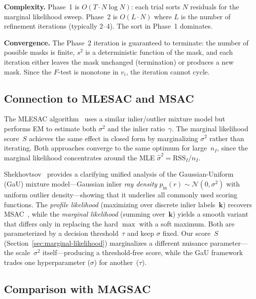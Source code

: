 \documentclass[11pt]{article}
\newcommand{\Normal}{\mathcal{N}}
\begin{document}
\noindent \textbf{Complexity.}
Phase~1 is $O(T \cdot N \log N)$: each trial sorts $N$ residuals for
the marginal likelihood sweep.  Phase~2 is $O(L \cdot N)$ where $L$
is the number of refinement iterations (typically 2--4).  The sort in
Phase~1 dominates.

\noindent \textbf{Convergence.}
The Phase~2 iteration is guaranteed to terminate: the number of
possible masks is finite, $s^2$ is a deterministic function of the
mask, and each iteration either leaves the mask unchanged (termination)
or produces a new mask.  Since the $F$-test is monotone in $v_i$, the
iteration cannot cycle.

\subsection{Connection to MLESAC and MSAC}
\label{sec:mlesac-connection}

The MLESAC algorithm~\cite{torr2000mlesac} uses a similar inlier/outlier
mixture model but performs EM to estimate both $\sigma^2$ and the inlier
ratio~$\gamma$.  The marginal likelihood score~$S$ achieves the same effect
in closed form by marginalizing $\sigma^2$ rather than iterating.  Both
approaches converge to the same optimum for large~$n_I$, since the
marginal likelihood concentrates around the MLE
$\hat\sigma^2 = \mathrm{RSS}_I / n_I$.

Shekhovtsov~\cite{shekhovtsov2025scoring} provides a clarifying unified
analysis of the Gaussian-Uniform (GaU) mixture model---Gaussian inlier
\emph{ray density} $p_{\mathrm{in}}(r) \sim \Normal(0, \sigma^2)$ with
uniform outlier density---showing that it underlies all commonly used
scoring functions.  The \emph{profile likelihood} (maximizing over
discrete inlier labels~$\mathbf{k}$) recovers
MSAC~\cite{torr1998robust}, while the \emph{marginal likelihood}
(summing over~$\mathbf{k}$) yields a smooth variant that differs only
in replacing the hard $\max$ with a soft maximum.  Both are
parameterized by a decision threshold~$\tau$ and keep $\sigma$ fixed.
Our score~$S$ (Section~\ref{sec:marginal-likelihood}) marginalizes a
different nuisance parameter---the scale~$\sigma^2$ itself---producing
a threshold-free score, while the GaU framework trades one
hyperparameter ($\sigma$) for another~($\tau$).

\subsection{Comparison with MAGSAC}
\label{sec:magsac-comparison}
\end{document}
